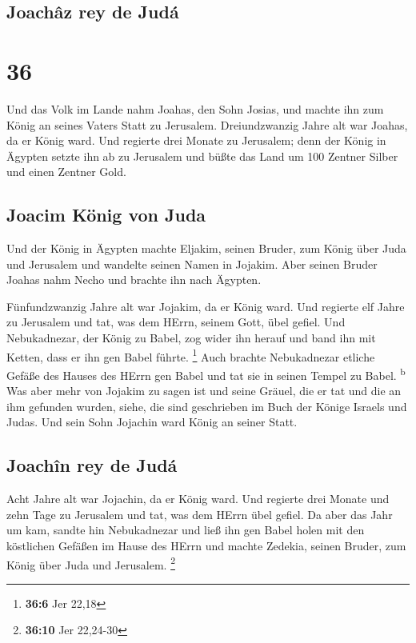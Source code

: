 \hypertarget{joachuxe2z-rey-de-juduxe1}{%
\subsection{Joachâz rey de Judá}\label{joachuxe2z-rey-de-juduxe1}}

\hypertarget{section-35}{%
\section{36}\label{section-35}}

 Und das Volk im Lande nahm Joahas, den Sohn Josias, und
machte ihn zum König an seines Vaters Statt zu Jerusalem. 
Dreiundzwanzig Jahre alt war Joahas, da er König ward. Und regierte drei
Monate zu Jerusalem;  denn der König in Ägypten setzte ihn
ab zu Jerusalem und büßte das Land um 100 Zentner Silber und einen
Zentner Gold.

\hypertarget{joacim-kuxf6nig-von-juda}{%
\subsection{Joacim König von Juda}\label{joacim-kuxf6nig-von-juda}}

 Und der König in Ägypten machte Eljakim, seinen Bruder,
zum König über Juda und Jerusalem und wandelte seinen Namen in Jojakim.
Aber seinen Bruder Joahas nahm Necho und brachte ihn nach Ägypten.

 Fünfundzwanzig Jahre alt war Jojakim, da er König ward.
Und regierte elf Jahre zu Jerusalem und tat, was dem HErrn, seinem Gott,
übel gefiel.  Und Nebukadnezar, der König zu Babel, zog
wider ihn herauf und band ihn mit Ketten, dass er ihn gen Babel führte.
\footnote{\textbf{36:6} Jer 22,18}  Auch brachte
Nebukadnezar etliche Gefäße des Hauses des HErrn gen Babel und tat sie
in seinen Tempel zu Babel. \textsuperscript{b}  Was aber
mehr von Jojakim zu sagen ist und seine Gräuel, die er tat und die an
ihm gefunden wurden, siehe, die sind geschrieben im Buch der Könige
Israels und Judas. Und sein Sohn Jojachin ward König an seiner Statt.

\hypertarget{joachuxeen-rey-de-juduxe1}{%
\subsection{Joachîn rey de Judá}\label{joachuxeen-rey-de-juduxe1}}

 Acht Jahre alt war Jojachin, da er König ward. Und
regierte drei Monate und zehn Tage zu Jerusalem und tat, was dem HErrn
übel gefiel.  Da aber das Jahr um kam, sandte hin
Nebukadnezar und ließ ihn gen Babel holen mit den köstlichen Gefäßen im
Hause des HErrn und machte Zedekia, seinen Bruder, zum König über Juda
und Jerusalem. \footnote{\textbf{36:10} Jer 22,24-30}


